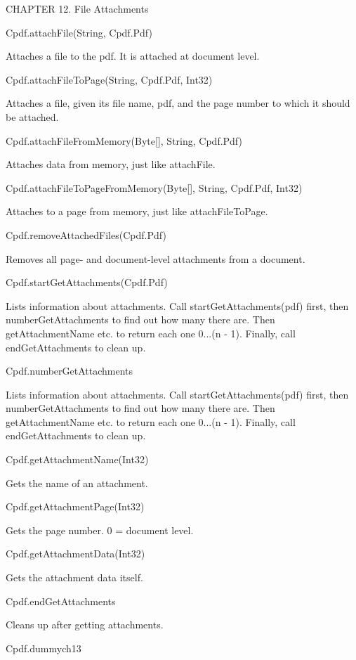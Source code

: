 CHAPTER 12. File Attachments

Cpdf.attachFile(String, Cpdf.Pdf)


Attaches a file to the pdf. It is attached
at document level.


Cpdf.attachFileToPage(String, Cpdf.Pdf, Int32)


Attaches a file, given
its file name, pdf, and the page number to which it should be attached.


Cpdf.attachFileFromMemory(Byte[], String, Cpdf.Pdf)


Attaches data from
memory, just like attachFile.


Cpdf.attachFileToPageFromMemory(Byte[], String, Cpdf.Pdf, Int32)


Attaches to a page from memory, just like attachFileToPage.


Cpdf.removeAttachedFiles(Cpdf.Pdf)


Removes all page- and document-level attachments from a document.


Cpdf.startGetAttachments(Cpdf.Pdf)


Lists information about attachments. Call startGetAttachments(pdf)
first, then numberGetAttachments to find out how many there are. Then
getAttachmentName etc. to return each one 0...(n - 1). Finally, call
endGetAttachments to clean up.


Cpdf.numberGetAttachments


Lists information about attachments. Call startGetAttachments(pdf)
first, then numberGetAttachments to find out how many there are. Then
getAttachmentName etc. to return each one 0...(n - 1). Finally, call
endGetAttachments to clean up.


Cpdf.getAttachmentName(Int32)


Gets the name of an attachment.


Cpdf.getAttachmentPage(Int32)


Gets the page number. 0 = document level.


Cpdf.getAttachmentData(Int32)


Gets the attachment data itself.


Cpdf.endGetAttachments


Cleans up after getting attachments.


Cpdf.dummych13

